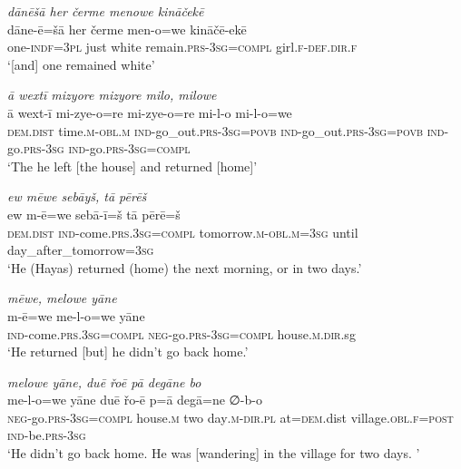\ea \label{ŽH.85}
\textit{dānēšā her čerme menowe kināčekē} \\ 
\gll dāne-ē=šā her čerme men-o=we kināčē-ekē \\ 
 one\textsc{-indf}\textsc{=3pl} just white remain\textsc{.prs}\textsc{-3sg}\textsc{=compl} girl\textsc{\textsc{.f}}\textsc{-def}\textsc{.dir}\textsc{\textsc{.f}} \\ 
\glt `[and] one remained white'
\z 
 
\ea \label{ŽH.106}
\textit{ā wextī mizyore mizyore milo, milowe} \\ 
\gll ā wext-ī mi-zye-o=re mi-zye-o=re mi-l-o mi-l-o=we \\ 
 \textsc{dem.dist} time\textsc{.m}\textsc{-obl}\textsc{.m} \textsc{ind-}go\_out\textsc{.prs}\textsc{-3sg}\textsc{=\textsc{povb}} \textsc{ind-}go\_out\textsc{.prs}\textsc{-3sg}\textsc{=\textsc{povb}} \textsc{ind-}go\textsc{.prs}\textsc{-3sg} \textsc{ind-}go\textsc{.prs}\textsc{-3sg}\textsc{=compl} \\ 
\glt `The he left [the house] and returned [home]'
\z 
 
\ea \label{ŽH.107}
\textit{ew mēwe sebāyš, tā pērēš} \\ 
\gll ew m-ē=we sebā-ī=š tā pērē=š \\ 
 \textsc{dem.dist} \textsc{ind-}come\textsc{.prs}\textsc{.3sg}\textsc{=compl} tomorrow\textsc{.m}\textsc{-obl}\textsc{.m}\textsc{=3sg} until day\_after\_tomorrow\textsc{=3sg} \\ 
\glt `He (Hayas) returned (home) the next morning, or in two days.'
\z 
 
\ea \label{ŽH.108}
\textit{mēwe, melowe yāne} \\ 
\gll m-ē=we me-l-o=we yāne \\ 
 \textsc{ind-}come\textsc{.prs}\textsc{.3sg}\textsc{=compl} \textsc{neg-}go\textsc{.prs}\textsc{-3sg}\textsc{=compl} house\textsc{.m}\textsc{.dir}.sg \\ 
\glt `He returned [but] he didn’t go back home.'
\z 
 
\ea \label{ŽH.109}
\textit{melowe yāne, duē řoē pā degāne bo} \\ 
\gll me-l-o=we yāne duē řo-ē p=ā degā=ne ∅-b-o \\ 
 \textsc{neg-}go\textsc{.prs}\textsc{-3sg}\textsc{=compl} house\textsc{.m} two day\textsc{.m}\textsc{-dir}\textsc{.pl} at\textsc{=dem}.dist village\textsc{.obl}\textsc{\textsc{.f}}\textsc{=\textsc{post}} \textsc{ind-}be\textsc{.prs}\textsc{-3sg} \\ 
\glt `He didn’t go back home. He was [wandering] in the village for two days. '
\z 
 
